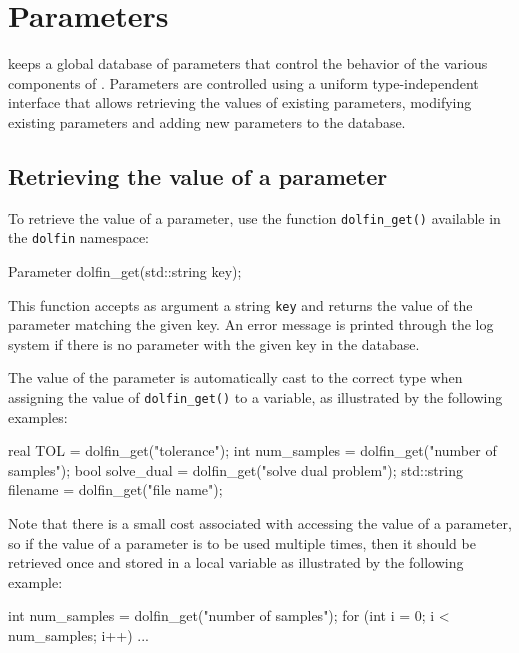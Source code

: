 \chapter{Parameters}
\label{sec:parameters}


\dolfin{} keeps a global database of parameters that control the
behavior of the various components of \dolfin{}. Parameters are
controlled using a uniform type-independent interface that allows
retrieving the values of existing parameters, modifying existing
parameters and adding new parameters to the database.

\section{Retrieving the value of a parameter}

To retrieve the value of a parameter, use the function \texttt{dolfin\_get()}
available in the \texttt{dolfin} namespace:
\begin{code}
Parameter dolfin_get(std::string key);
\end{code}
This function accepts as argument a string \texttt{key} and returns
the value of the parameter matching the given key. An error message is
printed through the log system if there is no parameter with the given
key in the database.

The value of the parameter is automatically cast to the correct type
when assigning the value of \texttt{dolfin\_get()} to a variable, as
illustrated by the following examples:
\begin{code}
real TOL = dolfin_get("tolerance");
int num_samples = dolfin_get("number of samples");
bool solve_dual = dolfin_get("solve dual problem");
std::string filename = dolfin_get("file name");
\end{code}

Note that there is a small cost associated with accessing the value of
a parameter, so if the value of a parameter is to be used multiple
times, then it should be retrieved once and stored in a local variable
as illustrated by the following example:
\begin{code}
int num_samples = dolfin_get("number of samples");
for (int i = 0; i < num_samples; i++)
{
  ...
}
\end{code}

